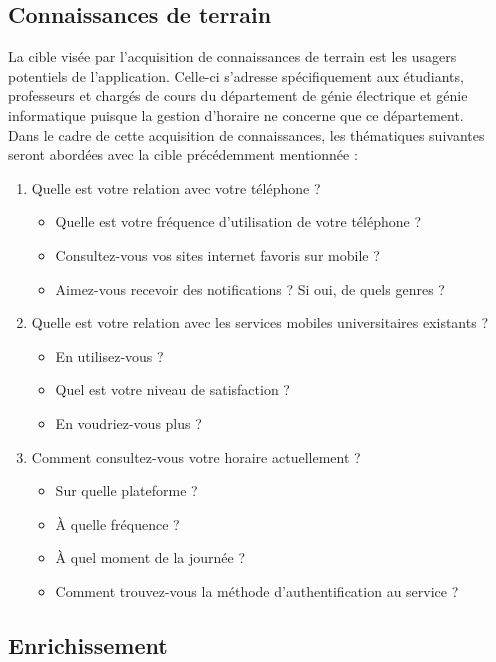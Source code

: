 	\subsection{Connaissances de terrain}
	La cible visée par l'acquisition de connaissances de terrain est les usagers potentiels de l'application. Celle-ci s'adresse spécifiquement aux étudiants, professeurs et chargés de cours du département de génie électrique et génie informatique puisque la gestion d'horaire ne concerne que ce département. \\
	
	Dans le cadre de cette acquisition de connaissances, les thématiques suivantes seront abordées avec la cible précédemment mentionnée :

	\begin{enumerate}
		\item Quelle est votre relation avec votre téléphone ?
		\begin{itemize}
			\item Quelle est votre fréquence d'utilisation de votre téléphone ?
			\item Consultez-vous vos sites internet favoris sur mobile ?
			\item Aimez-vous recevoir des notifications ? Si oui, de quels genres ?
		\end{itemize}
		\item Quelle est votre relation avec les services mobiles universitaires existants ?
		\begin{itemize}
			\item En utilisez-vous ?
			\item Quel est votre niveau de satisfaction ?
			\item En voudriez-vous plus ?
		\end{itemize}
		\item Comment consultez-vous votre horaire actuellement ?
		\begin{itemize}
			\item Sur quelle plateforme ?
			\item À quelle fréquence ?
			\item À quel moment de la journée ?
			\item Comment trouvez-vous la méthode d'authentification au service ?
		\end{itemize}
	\end{enumerate}
	
	\subsection{Enrichissement}
	
